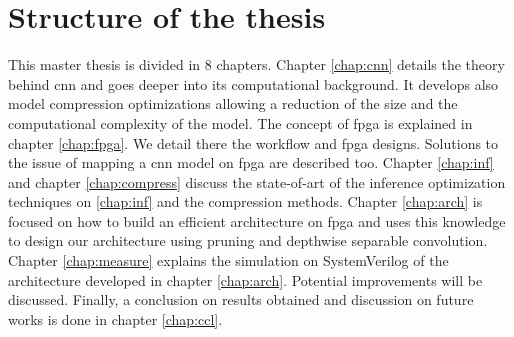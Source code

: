 \section*{Structure of the thesis}
This master thesis is divided in 8 chapters. \newline \newline
%
Chapter \ref{chap:cnn} details the theory behind \acrshort{cnn} and goes deeper into its computational background. It develops also model compression optimizations allowing a reduction of the size and the computational complexity of the model. \newline \newline
%
The concept of \acrshort{fpga} is explained in chapter \ref{chap:fpga}. We detail there the workflow and \acrshort{fpga} designs. Solutions to the issue of mapping a \acrshort{cnn} model on \acrshort{fpga} are described too. \newline \newline
%
Chapter \ref{chap:inf} and chapter \ref{chap:compress} discuss the state-of-art of the inference optimization techniques on \ref{chap:inf} and the compression methods.\newline \newline
%
Chapter \ref{chap:arch} is focused on how to build an efficient architecture on \acrshort{fpga} and uses this knowledge to design our architecture using pruning and depthwise separable convolution.\newline \newline
%
Chapter \ref{chap:measure} explains the simulation on SystemVerilog of the architecture developed in chapter \ref{chap:arch}. Potential improvements will be discussed.\newline \newline
%
Finally, a conclusion on results obtained and discussion on future works is done in chapter \ref{chap:ccl}.
\afterpage{\blankpage}
\cleardoublepage
\newpage
